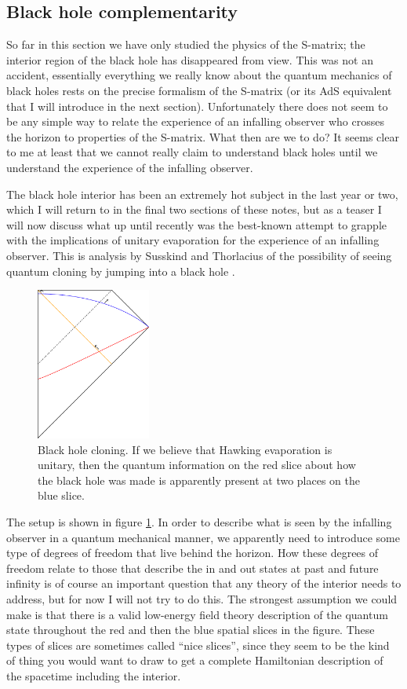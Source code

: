 \documentclass[12pt]{article}
\begin{document}
\subsection{Black hole complementarity}\label{compsec1}
So far in this section we have only studied the physics of the S-matrix; the interior region of the black hole has disappeared from view.  This was not an accident, essentially everything we really know about the quantum mechanics of black holes rests on the precise formalism of the S-matrix (or its AdS equivalent that I will introduce in the next section).  Unfortunately there does not seem to be any simple way to relate the experience of an infalling observer who crosses the horizon to properties of the S-matrix.  What then are we to do?  It seems clear to me at least that we cannot really claim to understand black holes until we understand the experience of the infalling observer.  

The black hole interior has been an extremely hot subject in the last year or two, which I will return to in the final two sections of these notes, but as a teaser I will now discuss what up until recently was the best-known attempt to grapple with the implications of unitary evaporation for the experience of an infalling observer.  This is analysis by Susskind and Thorlacius of the possibility of seeing quantum cloning by jumping into a black hole \cite{Susskind:1993mu}. 

\begin{figure}
\begin{center}
\includegraphics[height=5cm]{cloning.pdf}
\caption{Black hole cloning.  If we believe that Hawking evaporation is unitary, then the quantum information on the red slice about how the black hole was made is apparently present at two places on the blue slice.}\label{cloning}
\end{center}
\end{figure}
The setup is shown in figure \ref{cloning}.  In order to describe what is seen by the infalling observer in a quantum mechanical manner, we apparently need to introduce some type of degrees of freedom that live behind the horizon.  How these degrees of freedom relate to those that describe the in and out states at past and future infinity is of course an important question that any theory of the interior needs to address, but for now I will not try to do this.  The strongest assumption we could make is that there is a valid low-energy field theory description of the quantum state throughout the red and then the blue spatial slices in the figure.  These types of slices are sometimes called ``nice slices'', since they seem to be the kind of thing you would want to draw to get a complete Hamiltonian description of the spacetime including the interior.  
\end{document}
